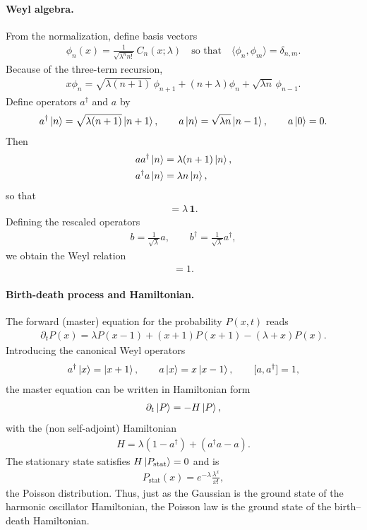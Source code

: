 \documentclass[a4paper,11pt]{article}
\numberwithin{equation}{section}
\theoremstyle{plain}
\theoremstyle{definition}
\theoremstyle{remark}
\newcommand{\1}{\ensuremath{\mathds{1}}\xspace}
\begin{document}
\paragraph{Weyl algebra.}
From the normalization, define basis vectors
\begin{align}
    \phi_n(x)=\frac{1}{\sqrt{\lambda^n n!}}\,C_n(x;\lambda)
    \quad\text{so that}\quad
    \langle \phi_n,\phi_m\rangle=\delta_{n,m}.
\end{align}
Because of the three-term recursion,
\begin{align}
    x\phi_n
    =\sqrt{\lambda(n+1)}\,\phi_{n+1}
    +(n+\lambda)\phi_n
    +\sqrt{\lambda n}\,\phi_{n-1}.
\end{align}
Define operators $a^\dagger$ and $a$ by
\begin{align}
    a^\dagger\ket{n}=\sqrt{\lambda(n+1)}\ket{n+1},
    \qquad
    a\ket{n}=\sqrt{\lambda n}\ket{n-1},
    \qquad
    a\ket{0}=0.
\end{align}
Then 
\begin{align}
    aa^\dagger\ket{n} &= \lambda(n+1)\ket{n},\\
    a^\dagger a\ket{n} &= \lambda n\ket{n},
\end{align}
so that
\begin{align}
    [a,a^\dagger]=\lambda\,\mathbf{1}.
\end{align}
Defining the rescaled operators
\begin{align}
    b=\frac{1}{\sqrt{\lambda}}a,
    \qquad
    b^\dagger=\frac{1}{\sqrt{\lambda}}a^\dagger,
\end{align}
we obtain the Weyl relation
\begin{align}
    [b,b^\dagger]=1.
\end{align}

\paragraph{Birth-death process and Hamiltonian.}
The forward (master) equation for the probability $P(x,t)$ reads
\begin{align}
\partial_t P(x)
=
\lambda P(x-1)
+
(x+1)P(x+1)
-
(\lambda+x)P(x).
\end{align}
Introducing the canonical Weyl operators
\begin{align}
a^\dagger\ket{x}=\ket{x+1},
\qquad
a\ket{x}=x\ket{x-1},
\qquad
[a,a^\dagger]=1,
\end{align}
the master equation can be written in Hamiltonian form
\begin{align}
\partial_t \ket{P} = - H \ket{P},
\end{align}
with the (non self-adjoint) Hamiltonian
\begin{align}
H
=
\lambda(1-a^\dagger)
+
(a^\dagger a - a).
\end{align}
The stationary state satisfies $H\ket{P_{\mathrm{stat}}}=0$ and is
\begin{align}
P_{\mathrm{stat}}(x)=e^{-\lambda}\frac{\lambda^x}{x!},
\end{align}
the Poisson distribution. Thus, just as the Gaussian is the ground state of the harmonic oscillator Hamiltonian, the Poisson law is the ground state of the birth--death Hamiltonian.
\end{document}
